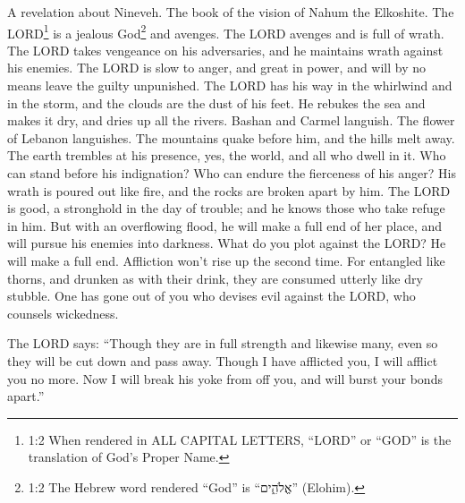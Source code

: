 




\vspace{-1.36in}


\mychapter{} \myverse*{}A revelation about Nineveh. The book of the vision of Nahum the
Elkoshite.
\myverse{}The LORD\footnote{1:2 When rendered in ALL CAPITAL LETTERS, “LORD” or “GOD” is the translation of God’s Proper Name.}
is a jealous God\footnote{1:2 The Hebrew word rendered “God” is “אֱלֹהִ֑ים” (Elohim).} and avenges. The LORD
avenges and is full of wrath. The LORD takes vengeance on his adversaries, and he maintains wrath against
his enemies.
\myverse{}The LORD is slow to anger, and great in power, and will by no means leave the
guilty unpunished. The LORD has his way in the whirlwind and in the storm, and the clouds are the dust
of his feet.
\myverse{}He rebukes the sea and makes it dry, and dries up all the rivers. Bashan and
Carmel languish. The flower of Lebanon languishes.
\myverse{}The mountains quake before him, and the hills melt away. The earth trembles
at his presence, yes, the world, and all who dwell in it.
\myverse{}Who can stand before his indignation? Who can endure the fierceness of his anger?
His wrath is poured out like fire, and the rocks are broken apart by him.
\myverse{}The LORD is good, a stronghold in the day of trouble; and he knows those who
take refuge in him.
\myverse{}But with an overflowing flood, he will make a full end of her place, and will
pursue his enemies into darkness.
\myverse{}What do you plot against the LORD? He will make a full end. Affliction won’t
rise up the second time.
\myverse{}For entangled like thorns, and drunken as with their drink, they are consumed
utterly like dry stubble.
\myverse{}One has gone out of you who devises evil against the LORD, who counsels wickedness.

\myverse{}The LORD says: “Though they are in full strength and likewise
many, even so they will be cut down and pass away. Though I have afflicted you, I will afflict you no
more.
\myverse{}Now I will break his yoke from off you, and will burst your bonds apart.”

